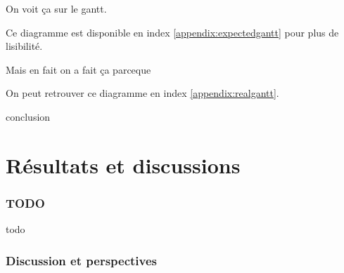\documentclass[a4paper]{article}
\begin{document}
On voit ça sur le gantt.

Ce diagramme est disponible en index \ref{appendix:expectedgantt} pour
plus de lisibilité.


Mais en fait on a fait ça parceque

On peut retrouver ce diagramme en index \ref{appendix:realgantt}.


conclusion


\clearpage
\part{Résultats et discussions}

\section{TODO}

todo

\clearpage
\section{Discussion et perspectives}
\end{document}
